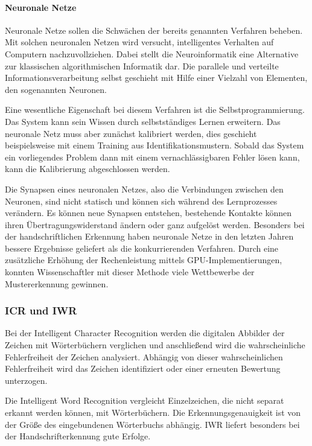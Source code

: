 \paragraph{Neuronale Netze}
Neuronale Netze sollen die Schwächen der bereits genannten Verfahren beheben. Mit solchen neuronalen Netzen wird versucht, intelligentes Verhalten auf Computern nachzuvollziehen. Dabei stellt die Neuroinformatik eine Alternative zur klassischen algorithmischen Informatik dar. Die parallele und verteilte Informationsverarbeitung selbst geschieht mit Hilfe einer Vielzahl von Elementen, den sogenannten Neuronen.

Eine wesentliche Eigenschaft bei diesem Verfahren ist die Selbstprogrammierung. Das System kann sein Wissen durch selbstständiges Lernen erweitern. Das neuronale Netz muss aber zunächst kalibriert werden, dies geschieht beispielsweise mit einem Training aus Identifikationsmustern. Sobald das System ein vorliegendes Problem dann mit einem vernachlässigbaren Fehler lösen kann, kann die Kalibrierung abgeschlossen werden.

\newpage

Die Synapsen eines neuronalen Netzes, also die Verbindungen zwischen den Neuronen, sind nicht statisch und können sich während des Lernprozesses verändern. Es können neue Synapsen entstehen, bestehende Kontakte können ihren Übertragungswiderstand ändern oder ganz aufgelöst werden. Besonders bei der handschriftlichen Erkennung haben neuronale Netze in den letzten Jahren bessere Ergebnisse geliefert als die konkurrierenden Verfahren. Durch eine zusätzliche Erhöhung der Rechenleistung mittels GPU-Implementierungen, konnten Wissenschaftler mit dieser Methode viele Wettbewerbe der Mustererkennung gewinnen. \cite{OCRB}

\subsubsection{ICR und IWR}
Bei der Intelligent Character Recognition werden die digitalen Abbilder der Zeichen mit Wörterbüchern verglichen und anschließend wird die wahrscheinliche Fehlerfreiheit der Zeichen analysiert. Abhängig von dieser wahrscheinlichen Fehlerfreiheit wird das Zeichen identifiziert oder einer erneuten Bewertung unterzogen.

Die Intelligent Word Recognition vergleicht Einzelzeichen, die nicht separat erkannt werden können, mit Wörterbüchern. Die Erkennungsgenauigkeit ist von der Größe des eingebundenen Wörterbuchs abhängig. IWR liefert besonders bei der Handschrifterkennung gute Erfolge.

